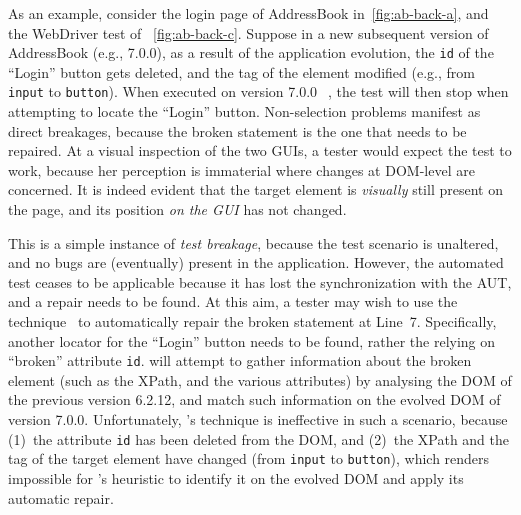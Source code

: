 As an example, consider the login page of AddressBook in~\autoref{fig:ab-back-a}, and the WebDriver test of ~\autoref{fig:ab-back-c}. %
%
Suppose in a new subsequent version of AddressBook (e.g., 7.0.0), as a result of the application evolution, the \texttt{id} of the ``Login'' button gets deleted, and the tag of the element modified (e.g., from \texttt{input} to \texttt{button}). 
When executed on version 7.0.0~\textcircled{}, the test will then stop when attempting to locate the ``Login'' button. Non-selection problems manifest as direct breakages, because the broken statement is the one that needs to be repaired.  
%
At a visual inspection of the two GUIs, a tester would expect the test to work, because her perception is immaterial where changes at DOM-level are concerned. It is indeed evident that the target element is \textit{visually} still present on the page, and its position \textit{on the GUI} has not changed.
 
This is a simple instance of \textit{test breakage}, because the test scenario is unaltered, and no bugs are (eventually) present in the application. However, the automated test ceases to be applicable because it has lost the synchronization with the AUT, and a repair needs to be found.
At this aim, a tester may wish to use the \water  technique~\cite{Choudhary:2011:WWA:2002931.2002935} to automatically repair the broken statement at Line~7. Specifically, another locator for the ``Login'' button needs to be found, rather the relying on ``broken'' attribute \texttt{id}. \water will attempt to gather information about the broken element (such as the XPath, and the various attributes) by analysing the DOM of the previous version 6.2.12, and match such information on the evolved DOM of version 7.0.0. Unfortunately, \water's technique is ineffective in such a scenario, because (1)~the attribute \texttt{id} has been deleted from the DOM, and (2)~the XPath and the tag of the target element have changed (from \mbox{\texttt{input}} to \mbox{\texttt{button}}), which renders impossible for \water's heuristic to identify it on the evolved DOM and apply its automatic repair.
 
